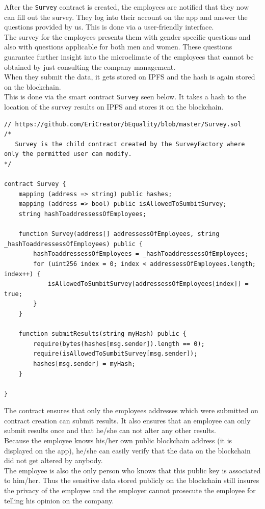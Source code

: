 After the \texttt{Survey} contract is created, the employees are notified that they now can fill out the survey. They log into their account on the app and answer the questions provided by us. This is done via a user-friendly interface.\\
The survey for the employees presents them with gender specific questions and also with questions applicable for both men and women. These questions guarantee further insight into the microclimate of the employees that cannot be obtained by just consulting the company management.\\
When they submit the data, it gets stored on IPFS and the hash is again stored on the blockchain.\\
This is done via the smart contract \texttt{Survey} seen below. It takes a hash to the location of the survey results on IPFS and stores it on the blockchain.\\
\begin{lstlisting}
// https://github.com/EriCreator/bEquality/blob/master/Survey.sol
/*
   Survey is the child contract created by the SurveyFactory where only the permitted user can modify.
*/

contract Survey {
    mapping (address => string) public hashes;
    mapping (address => bool) public isAllowedToSumbitSurvey;
    string hashToaddressessOfEmployees;

    function Survey(address[] addressessOfEmployees, string _hashToaddressessOfEmployees) public {
        hashToaddressessOfEmployees = _hashToaddressessOfEmployees;
        for (uint256 index = 0; index < addressessOfEmployees.length; index++) {
            isAllowedToSumbitSurvey[addressessOfEmployees[index]] = true;
        }
    }

    function submitResults(string myHash) public {
        require(bytes(hashes[msg.sender]).length == 0);
        require(isAllowedToSumbitSurvey[msg.sender]);
        hashes[msg.sender] = myHash;
    }

}
\end{lstlisting}
The contract ensures that only the employees addresses which were submitted on contract creation can submit results. It also ensures that an employee can only submit results once and that he/she can not alter any other results.\\
Because the employee knows his/her own public blockchain address (it is displayed on the app), he/she can easily verify that the data on the blockchain did not get altered by anybody.\\
The employee is also the only person who knows that this public key is associated to him/her. Thus the sensitive data stored publicly on the blockchain still insures the privacy of the employee and the employer cannot prosecute the employee for telling his opinion on the company.\\

